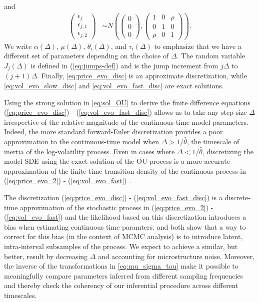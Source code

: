 and
\begin{align*}
  \left( \begin{matrix} \epsilon_{j} \\
      \epsilon_{j,1} \\ \epsilon_{j,2} \end{matrix} \right) &\sim
                                            N \left( \left(\begin{matrix} 0 \\ 0 \\
	                                          0 \end{matrix}
                                              \right) ,
  \left( \begin{matrix} 1 & 0 & \rho \\
      0 & 1 & 0 \\
    \rho & 0 & 1 \end{matrix} \right) \right) .
\end{align*}
We write $\alpha(\Delta)$, $\mu(\Delta)$, $\theta_i(\Delta)$, and
$\tau_i(\Delta)$ to emphasize that we have a different set of
parameters depending on the choice of $\Delta$. The random variable
$J_j(\Delta)$ is defined in (\ref{eq:jumps-def}) and is the jump
increment from $j\Delta$ to $(j+1)\Delta$. Finally,
\eqref{eq:price_evo_disc} is an approximate discretization, while
\eqref{eq:vol_evo_slow_disc} and \eqref{eq:vol_evo_fast_disc} are
exact solutions.

Using the strong solution in \eqref{eq:sol_OU} to derive the finite difference equations (\ref{eq:price_evo_disc}) - (\ref{eq:vol_evo_fast_disc}) allows us to take any step size $\Delta$ irrespective of the relative magnitude of the continuous-time model parameters. Indeed, the more standard forward-Euler discretization provides a poor approximation to the continuous-time model when $\Delta > 1/\hat{\theta}$, the timescale of inertia of the log-volatility process. Even in cases where $\Delta < 1/\hat{\theta}$, discretizing the model SDE  using the exact solution of the OU process is a more accurate approximation of the finite-time transition density of the continuous process in (\ref{eq:price_evo_2}) - (\ref{eq:vol_evo_fast}) \cite{elerian2001likelihood}.

The discretization (\ref{eq:price_evo_disc}) - (\ref{eq:vol_evo_fast_disc}) is a discrete-time approximation of the stochastic process in (\ref{eq:price_evo_2}) - (\ref{eq:vol_evo_fast}) and the likelihood based on this discretization introduces a bias when estimating continuous time paramters. \cite{elerian2001likelihood} and \cite{eraker2001mcmc} both show that a way to correct for this bias (in the context of MCMC analysis) is to introduce latent, intra-interval subsamples of the process. We expect to achieve a similar, but better, result by decreasing $\Delta$ and accounting for microstructure noise. Moreover, the inverse of the transformations in \eqref{eq:mu_sigma_tau} make it possible to meaningfully compare parameters inferred from different sampling frequencies and thereby check the coherency of our inferential procedure across different timescales.


